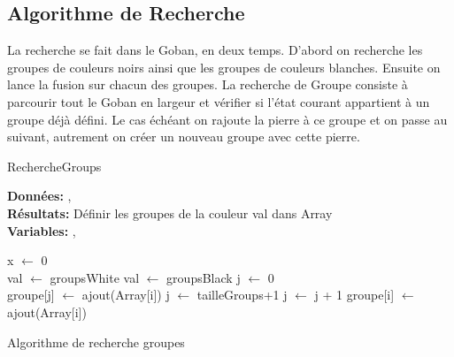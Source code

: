         \subsection{Algorithme de Recherche}
            La recherche se fait dans le Goban, en deux temps. D'abord on recherche les groupes de couleurs noirs ainsi que les groupes de couleurs blanches. Ensuite on lance la fusion sur chacun des groupes.
            La recherche de Groupe consiste à parcourir tout le Goban en largeur et vérifier si l'état courant appartient à un groupe déjà défini. Le cas échéant on rajoute la pierre à ce groupe et on passe au suivant, autrement on créer un nouveau groupe avec cette pierre.
            
            \begin{algorithme}
                \caption{RechercheGroups}
                \textbf{Données:}
                 ,
                \\
                \textbf{Résultats:} Définir les groupes de la couleur val dans Array\\
                \textbf{Variables:}
                ,
                
                x $\leftarrow$ 0\\
                {val $\leftarrow$ groupsWhite}
                {val $\leftarrow$ groupsBlack}
                {
                    {
                        j $\leftarrow$ 0 \\
                        {
                            {
                                    {
                                        groupe[j] $\leftarrow$ ajout(Array[i])
                                    }
                            }
                            {
                                j $\leftarrow$ tailleGroups+1
                            }
                            j $\leftarrow$ j + 1
                        }         
                                    {
                                        groupe[i] $\leftarrow$ ajout(Array[i]) 
                                    }
                    }
                }
                
                \caption{Algorithme de recherche groupes}
            \end{algorithme}
    
